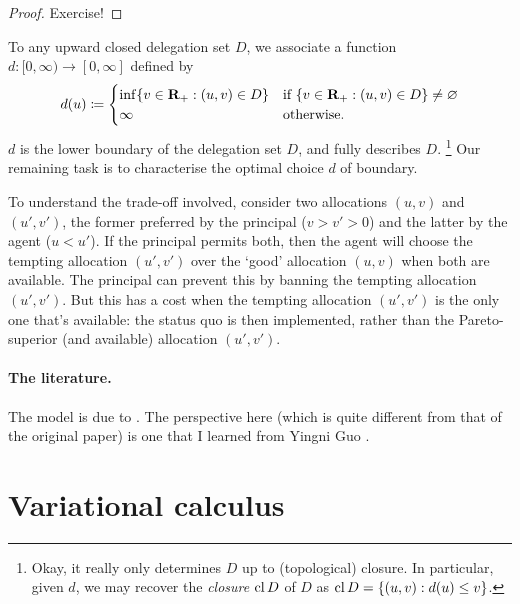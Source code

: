 \begin{proof}
	Exercise!
\end{proof}

To any upward closed delegation set $D$,
we associate a function $d : [0,\infty) \to [0,\infty]$ defined by
%
\begin{equation*}
	d(u)
	\coloneqq
	\begin{cases}
		\inf\left\{
		v \in \R_+ : (u,v) \in D
		\right\}
		& \text{if $\left\{
		v \in \R_+ : (u,v) \in D
		\right\} \neq \varnothing$} \\
		\infty
		& \text{otherwise.}
	\end{cases}
\end{equation*}
%
$d$ is the lower boundary of the delegation set $D$, and fully describes $D$.%
	\footnote{Okay, it really only determines $D$ up to (topological) closure.
	In particular, given $d$, we may recover the \emph{closure} $\operatorname*{cl} D$ of $D$ as $\cl D = \left\{ (u,v) : d(u) \leq v \right\}$.}
Our remaining task is to characterise the optimal choice $d$ of boundary.

To understand the trade-off involved,
consider two allocations $(u,v)$ and $(u',v')$, the former preferred by the principal ($v>v'>0$) and the latter by the agent ($u<u'$).
If the principal permits both, then the agent will choose the tempting allocation $(u',v')$ over the `good' allocation $(u,v)$ when both are available.
The principal can prevent this by banning the tempting allocation $(u',v')$.
But this has a cost when the tempting allocation $(u',v')$ is the only one that's available: the status quo is then implemented, rather than the Pareto-superior (and available) allocation $(u',v')$.


\paragraph{The literature.} The model is due to \textcite{ArmstrongVickers2010}. The perspective here (which is quite different from that of the original paper) is one that I learned from Yingni Guo \parencite[see][]{GuoShmaya2021}.



\section{Variational calculus}
\label{sec:ch4:variation}

